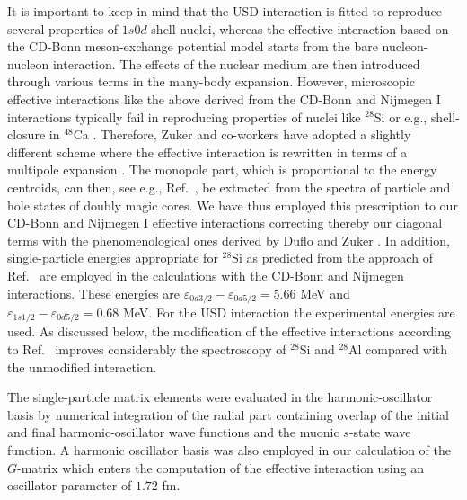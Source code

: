\begin{multicols}{2}
It is important to keep in mind that the USD
interaction is fitted to reproduce several properties of
$1s0d$ shell nuclei, whereas the effective interaction based on the
CD-Bonn meson-exchange potential model starts from the
bare nucleon-nucleon interaction. The effects of the
nuclear medium are then introduced through various terms
in the many-body expansion. However, microscopic effective interactions
like the above derived from the CD-Bonn and Nijmegen I interactions
typically fail in reproducing properties of nuclei like $^{28}$Si
or e.g., shell-closure in $^{48}$Ca \cite{hko95}.
Therefore, Zuker and co-workers \cite{zuk94,zuk98} have adopted a slightly
different scheme where the effective interaction is
rewritten in terms of a multipole expansion \cite{zuk94}.
The monopole part, which is proportional to the energy centroids,
can then, see e.g., Ref.\
\cite{zuk98}, be extracted from the spectra of particle
and hole states of doubly magic cores. We have thus employed this
prescription to our CD-Bonn and Nijmegen I effective interactions
correcting thereby our diagonal terms with the phenomenological
ones derived by Duflo and Zuker \cite{zuk98}. In addition, single-particle
energies appropriate for $^{28}$Si as  
predicted from the approach of Ref.\ \cite{zuk98} are 
employed in the calculations with the CD-Bonn and Nijmegen interactions.
These energies are $\varepsilon_{0d3/2}-\varepsilon_{0d5/2}=5.66$ MeV and
$\varepsilon_{1s1/2}-\varepsilon_{0d5/2}=0.68$ MeV. For the USD interaction
the experimental energies are used.
As discussed below, the modification of the effective interactions according
to Ref.\ \cite{zuk98} 
improves considerably the spectroscopy of $^{28}$Si and $^{28}$Al
compared with the unmodified interaction.

The single-particle
matrix elements were evaluated in the harmonic-oscillator basis
by numerical integration of the radial
part containing overlap of the initial and final harmonic-oscillator
wave functions and the muonic $s$-state wave function.
A harmonic oscillator basis was also employed in our calculation
of the $G$-matrix which enters the computation of the effective
interaction using an oscillator parameter of $1.72$ fm.


\end{multicols}
